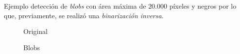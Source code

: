 Ejemplo detección de \emph{blobs} con área máxima de $20.000$ píxeles
y negros por lo que, previamente, se realizó una \emph{binarización
  inversa}.

\begin{figure}[H]
  \caption{Original}
  \centering \setlength\fboxsep{0pt} \setlength\fboxrule{0.5pt}
\end{figure}

\begin{figure}[H]
  \centering \setlength\fboxsep{0pt} \setlength\fboxrule{0.5pt}
  \caption{Blobs}
\end{figure}